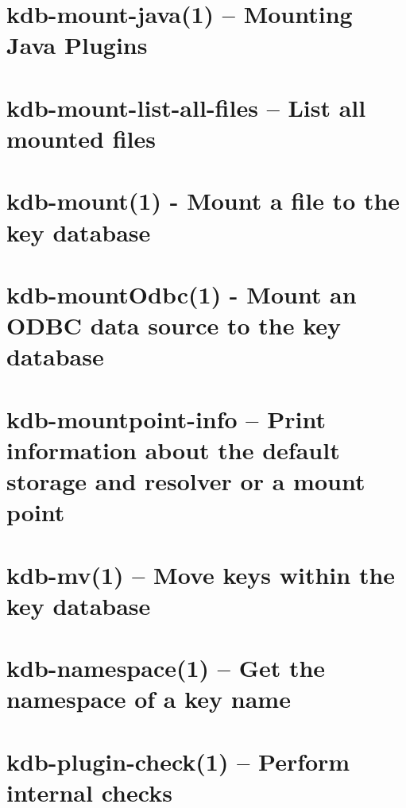 \let\mypdfximage\pdfximage\def\pdfximage{\immediate\mypdfximage}\documentclass[twoside]{book}
\newcommand{\+}{\discretionary{\mbox{\scriptsize$\hookleftarrow$}}{}{}}
\begin{document}
\chapter{kdb-\/mount-\/java(1) -- Mounting Java Plugins}
\label{doc_help_kdb-mount-java_md}

\chapter{kdb-\/mount-\/list-\/all-\/files -- List all mounted files}
\label{doc_help_kdb-mount-list-all-files_md}

\chapter{kdb-\/mount(1) -\/ Mount a file to the key database}
\label{doc_help_kdb-mount_md}

\chapter{kdb-\/mount\+Odbc(1) -\/ Mount an ODBC data source to the key database}
\label{doc_help_kdb-mountOdbc_md}

\chapter{kdb-\/mountpoint-\/info -- Print information about the default storage and resolver or a mount point}
\label{doc_help_kdb-mountpoint-info_md}

\chapter{kdb-\/mv(1) -- Move keys within the key database}
\label{doc_help_kdb-mv_md}

\chapter{kdb-\/namespace(1) -- Get the namespace of a key name}
\label{doc_help_kdb-namespace_md}

\chapter{kdb-\/plugin-\/check(1) -- Perform internal checks}
\label{doc_help_kdb-plugin-check_md}

\end{document}
